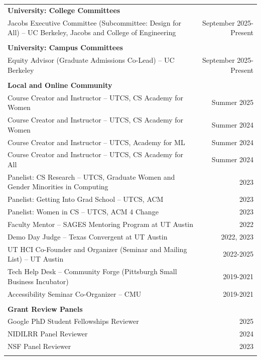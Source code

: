 \begin{longtable}{Xr}
	\textbf{University: College Committees} &  \\
	Jacobs Executive Committee (Subcommittee: Design for All) -- UC Berkeley, Jacobs and College of Engineering & September 2025-Present \\
	\\

	\textbf{University: Campus Committees} &  \\
	Equity Advisor (Graduate Admissions Co-Lead) -- UC Berkeley & September 2025-Present \\
	\\

	\textbf{Local and Online Community} &  \\
	Course Creator and Instructor -- UTCS, CS Academy for Women & Summer 2025 \\
	Course Creator and Instructor -- UTCS, CS Academy for Women & Summer 2024 \\
	Course Creator and Instructor -- UTCS, Academy for ML & Summer 2024 \\
	Course Creator and Instructor -- UTCS, CS Academy for All & Summer 2024 \\
	Panelist: CS Research -- UTCS, Graduate Women and Gender Minorities in Computing & 2023 \\
	Panelist: Getting Into Grad School -- UTCS, ACM & 2023 \\
	Panelist: Women in CS -- UTCS, ACM 4 Change & 2023 \\
	Faculty Mentor -- SAGES Mentoring Program at UT Austin & 2022 \\
	Demo Day Judge -- Texas Convergent at UT Austin & 2022, 2023 \\
	UT HCI Co-Founder and Organizer (Seminar and Mailing List) -- UT Austin & 2022-2025 \\
	Tech Help Desk -- Community Forge (Pittsburgh Small Business Incubator) & 2019-2021 \\
	Accessibility Seminar Co-Organizer -- CMU & 2019-2021 \\
	\\

	\textbf{Grant Review Panels} &  \\
	Google PhD Student Fellowships Reviewer & 2025 \\
	NIDILRR Panel Reviewer & 2024 \\
	NSF Panel Reviewer & 2023 \\
	\\

\end{longtable}